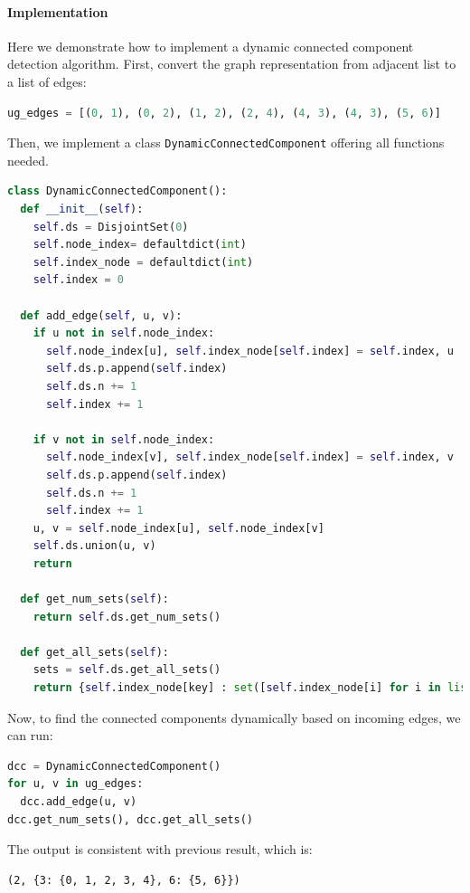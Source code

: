 \documentclass[../main.tex]{subfiles}
\begin{document}
\paragraph{Implementation} Here we demonstrate how to implement a dynamic connected component detection algorithm. First, convert the graph representation from adjacent list to a list of edges:
\begin{lstlisting}[language=Python]
ug_edges = [(0, 1), (0, 2), (1, 2), (2, 4), (4, 3), (4, 3), (5, 6)]
\end{lstlisting}
Then, we implement a class \texttt{DynamicConnectedComponent} offering all functions needed.
\begin{lstlisting}[language=Python]
class DynamicConnectedComponent():
  def __init__(self):
    self.ds = DisjointSet(0)
    self.node_index= defaultdict(int)
    self.index_node = defaultdict(int)
    self.index = 0

  def add_edge(self, u, v):
    if u not in self.node_index:
      self.node_index[u], self.index_node[self.index] = self.index, u
      self.ds.p.append(self.index)
      self.ds.n += 1
      self.index += 1
      
    if v not in self.node_index:
      self.node_index[v], self.index_node[self.index] = self.index, v
      self.ds.p.append(self.index)
      self.ds.n += 1
      self.index += 1
    u, v = self.node_index[u], self.node_index[v]
    self.ds.union(u, v)
    return

  def get_num_sets(self):
    return self.ds.get_num_sets()

  def get_all_sets(self):
    sets = self.ds.get_all_sets()
    return {self.index_node[key] : set([self.index_node[i] for i in list(value)]) for key, value in sets.items()} 
\end{lstlisting}
Now, to find the connected components dynamically based on incoming edges, we can run:
\begin{lstlisting}[language=Python]
dcc = DynamicConnectedComponent()
for u, v in ug_edges: 
  dcc.add_edge(u, v)
dcc.get_num_sets(), dcc.get_all_sets()
\end{lstlisting}
The output is consistent with previous result, which is:
\begin{lstlisting}
(2, {3: {0, 1, 2, 3, 4}, 6: {5, 6}})
\end{lstlisting}
\end{document}
